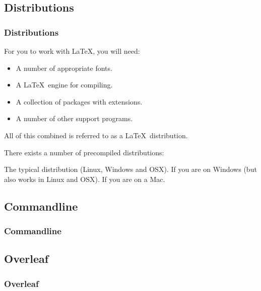 {\subsection{Distributions}
\begin{frame}[fragile]
  \frametitle{Distributions}
  \vspace{3mm}
  For you to work with \LaTeX, you will need:
  \begin{itemize}
    \item A number of appropriate fonts.
    \item A \LaTeX\ engine for compiling.
    \item A collection of packages with extensions.
    \item A number of other support programs.
  \end{itemize}
  
  \vspace{5mm}
  All of this combined is referred to as a \LaTeX\ distribution.
  
  \vspace{5mm}
  There exists a number of precompiled distributions:
  \begin{itemize}
     The typical distribution (Linux, Windows and OSX).
     If you are on Windows (but also works in Linux and OSX).
     If you are on a Mac.
  \end{itemize}
\end{frame}

\subsection{Commandline}
\begin{frame}[fragile]
  \frametitle{Commandline}
  \vspace{3mm}
  
\end{frame}

\subsection{Overleaf}
\begin{frame}[fragile]
  \frametitle{Overleaf}
\end{frame}

}
